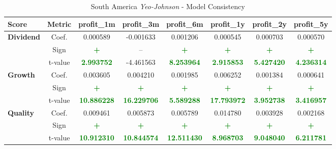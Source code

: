 \documentclass[11pt,english,a4paper,hidelinks]{book}
\begin{document}
\begin{table}[H]
    \centering
    \caption{South America \textit{Yeo-Johnson} - Model Consistency}
    \begin{tabular}{lccccccc}
        \toprule
        \textbf{Score} & \textbf{Metric} & \textbf{profit\_1m} & \textbf{profit\_3m} & \textbf{profit\_6m} & \textbf{profit\_1y} & \textbf{profit\_2y} & \textbf{profit\_5y} \\
        \midrule
        \multirow{3}{*}{\textbf{Dividend}} 
            & Coef. & 0.000589 & -0.001633 & 0.001206 & 0.000545 & 0.000703 & 0.000570 \\
            & Sign & \textbf{\textcolor{green}{+}} & – & \textbf{\textcolor{green}{+}} & \textbf{\textcolor{green}{+}} & \textbf{\textcolor{green}{+}} & \textbf{\textcolor{green}{+}} \\
            & t-value & \textbf{\textcolor{green}{2.993752}} & -4.461563 & \textbf{\textcolor{green}{8.253964}} & \textbf{\textcolor{green}{2.915853}} & \textbf{\textcolor{green}{5.427420}} & \textbf{\textcolor{green}{4.236314}} \\
        \midrule
        \multirow{3}{*}{\textbf{Growth}} 
            & Coef. & 0.003605 & 0.004210 & 0.001985 & 0.006252 & 0.001384 & 0.000641 \\
            & Sign & \textbf{\textcolor{green}{+}} & \textbf{\textcolor{green}{+}} & \textbf{\textcolor{green}{+}} & \textbf{\textcolor{green}{+}} & \textbf{\textcolor{green}{+}} & \textbf{\textcolor{green}{+}} \\
            & t-value & \textbf{\textcolor{green}{10.886228}} & \textbf{\textcolor{green}{16.229706}} & \textbf{\textcolor{green}{5.589288}} & \textbf{\textcolor{green}{17.793972}} & \textbf{\textcolor{green}{3.952738}} & \textbf{\textcolor{green}{3.416957}} \\
        \midrule
        \multirow{3}{*}{\textbf{Quality}} 
            & Coef. & 0.009461 & 0.005873 & 0.005789 & 0.014780 & 0.003928 & 0.002168 \\
            & Sign & \textbf{\textcolor{green}{+}} & \textbf{\textcolor{green}{+}} & \textbf{\textcolor{green}{+}} & \textbf{\textcolor{green}{+}} & \textbf{\textcolor{green}{+}} & \textbf{\textcolor{green}{+}} \\
            & t-value & \textbf{\textcolor{green}{10.912310}} & \textbf{\textcolor{green}{10.844574}} & \textbf{\textcolor{green}{12.511430}} & \textbf{\textcolor{green}{8.968703}} & \textbf{\textcolor{green}{9.048040}} & \textbf{\textcolor{green}{6.211781}} \\

\end{tabular}
\end{table}
\end{document}
